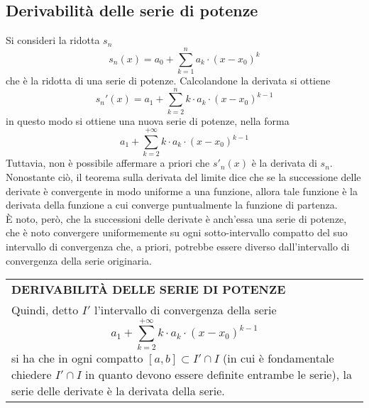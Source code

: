 \documentclass[a4paper]{extarticle}
\renewcommand\arraystretch{}
\begin{document}
\subsection{Derivabilità delle serie di potenze}
Si consideri la ridotta $s_n$
\[s_n(x) = a_0 + \sum_{k=1}^n a_k \cdot (x-x_0)^k\]
che è la ridotta di una serie di potenze. Calcolandone la derivata si ottiene
\[s_n'(x) = a_1 + \sum_{k=2}^{n} k \cdot a_k \cdot (x-x_0)^{k-1}\]
in questo modo si ottiene una nuova serie di potenze, nella forma
\[a_1 + \sum_{k=2}^{+\infty} k \cdot a_k \cdot (x-x_0)^{k-1}\]
Tuttavia, non è possibile affermare a priori che $s'_n(x)$ è la derivata di $s_n$. Nonostante ciò, il teorema sulla derivata del limite dice che se la successione delle derivate è convergente in modo uniforme a una funzione, allora tale funzione è la derivata della funzione a cui converge puntualmente la funzione di partenza.\\
È noto, però, che la successioni delle derivate è anch'essa una serie di potenze, che è noto convergere uniformemente su ogni sotto-intervallo compatto del suo intervallo di convergenza che, a priori, potrebbe essere diverso dall'intervallo di convergenza della serie originaria.

\vspace{1em}
\setlength{\tabcolsep}{14pt}
\renewcommand{\arraystretch}{2}
\noindent
\begin{tabularx}{\textwidth}{@{}|P|@{}}
    \hline
    {\textbf{DERIVABILITÀ DELLE SERIE DI POTENZE}}\\
    \parbox{\linewidth}{Quindi, detto $I'$ l'intervallo di convergenza della serie
    \[a_1 + \sum_{k=2}^{+\infty} k \cdot a_k \cdot (x-x_0)^{k-1}\]
    si ha che in ogni compatto $[a,b] \subset I' \cap I$ (in cui è fondamentale chiedere $I' \cap I$ in quanto devono essere definite entrambe le serie), la serie delle derivate è la derivata della serie.\vspace{3mm}}\\
    \hline
\end{tabularx}
\end{document}
